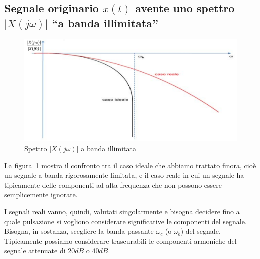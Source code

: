 \documentclass[a4paper]{report}
\begin{document}
\subsection{Segnale originario $x(t)$ avente uno spettro $|X(j
  \omega)|$ ``a banda illimitata''}
\begin{figure}[!h]
  \begin{center}
    \includegraphics[scale=0.3]{./figures/spettro_banda_illimitata.png}
    \caption{Spettro $|X(j \omega)|$ a banda
      illimitata}\label{fig:spettroBandaIllimitata} 
  \end{center}
\end{figure}
La figura~\ref{fig:spettroBandaIllimitata} mostra il confronto tra il
caso ideale che abbiamo trattato finora, cio\`e un segnale a banda
rigorosamente limitata, e il caso reale in cui un segnale ha
tipicamente delle componenti ad alta frequenza che non possono essere
semplicemente ignorate.

I segnali reali vanno, quindi, valutati singolarmente e bisogna
decidere fino a quale pulsazione si vogliono considerare
significative le componenti del segnale. Bisogna, in sostanza,
scegliere la banda passante $\omega_c$ (o $\omega_b$) del segnale.
Tipicamente possiamo considerare trascurabili le componenti armoniche
del segnale attenuate di $20dB$ o $40dB$. 
\end{document}
